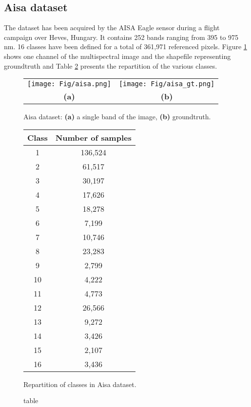 \documentclass[a4paper,11pt,DIV=16]{scrartcl}
\begin{document}
        \subsection{Aisa dataset}
        The dataset has been acquired by the AISA Eagle sensor during a flight campaign over Heves, Hungary. It contains 252 bands ranging from 395 to 975 nm. 16 classes have been defined for a total of 361,971 referenced pixels. Figure \ref{fig:aisa} shows one channel of the multispectral image and the shapefile representing groundtruth and Table \ref{tab:aisa} presents the repartition of the various classes.

        \begin{figure}[!ht]
            \centering
            \begin{tabular}{cc}
                \texttt{[image: Fig/aisa.png]} &
                \texttt{[image: Fig/aisa\_gt.png]} \\
                {\bfseries{(a)}} & {\bfseries{(b)}} \\
            \end{tabular}
            \caption{Aisa dataset: {\bfseries{(a)}} a single band of the image, {\bfseries{(b)}} groundtruth.\label{fig:aisa}}
        \end{figure}

        \begin{figure}[!ht]
            \centering
            \begin{tabular}[b]{cc}\hline
              Class & Number of samples \\ \hline
              1 & 136,524 \\
              2 & 61,517 \\
              3 & 30,197 \\
              4 & 17,626 \\
              5 & 18,278 \\
              6 & 7,199 \\
              7 & 10,746 \\
              8 & 23,283 \\
              9 & 2,799 \\
              10 & 4,222 \\
              11 & 4,773 \\
              12 & 26,566 \\
              13 & 9,272 \\
              14 & 3,426 \\
              15 & 2,107 \\
              16 & 3,436 \\ \hline
            \end{tabular}
            \caption{table}{Repartition of classes in Aisa dataset.\label{tab:aisa}}
        \end{figure}
\end{document}
